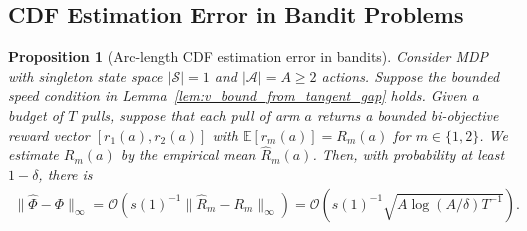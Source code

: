 \documentclass{article}
\newtheorem{proposition}{Proposition}
\newcommand{\Oc}{\mathcal{O}}
\newcommand{\Farc}{\Phi}
\newcommand{\hatFarc}{\hat{\Phi}}
\newcommand{\E}{\mathbb{E}}
\begin{document}
\subsection{CDF Estimation Error in Bandit Problems}
\label{appendix:bandit_R_and_Farc_err}

\begin{proposition}[Arc-length CDF estimation error in bandits]
\label{prop:bandit_R_and_Farc_err}
Consider MDP with singleton state space $|\mathcal{S}|=1$ and $|\mathcal{A}|=A\ge 2$ actions. Suppose the bounded speed condition in Lemma~\ref{lem:v_bound_from_tangent_gap} holds.
Given a budget of $T$ pulls, suppose that each pull of arm $a$ returns a bounded bi-objective reward vector
$[r_1(a),r_2(a)]$ with $\E[r_m(a)]=R_m(a)$ for $m\in\{1,2\}$.
We estimate $R_m(a)$ by the empirical mean $\hat R_m(a)$.
Then, with probability at least $1-\delta$, there is
\begin{align}
\|\hatFarc-\Farc\|_\infty
 = \Oc\left(s(1)^{-1}\|\hat R_m-R_m\|_\infty \right) = 
\Oc \left(s(1)^{-1}\sqrt{A\log(A/\delta)T^{-1}}\right).
\end{align}
\end{proposition}
\end{document}
